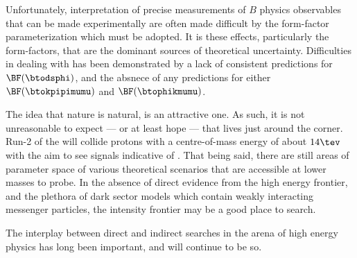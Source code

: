 Unfortunately, interpretation of precise measurements of $B$ physics observables that can be made
experimentally are often made difficult by the form-factor parameterization which must be adopted.
It is these \QCD effects, particularly the form-factors, that are the dominant sources of
theoretical uncertainty.
Difficulties in dealing with \QCD has been demonstrated by a lack of consistent predictions for
$\BF(\btodsphi)$, and the absnece of any predictions for either $\BF(\btokpipimumu)$ and
$\BF(\btophikmumu)$.

The idea that nature is natural, is an attractive one.
As such, it is not unreasonable to expect --- or at least hope --- that \np lives just
around the corner.
Run-2 of the \lhc will collide protons with a centre-of-mass energy of about $14\tev$ with the aim
to see signals indicative of \np.
That being said, there are still areas of parameter space of various theoretical scenarios that are
accessible at lower masses to probe.
In the absence of direct evidence from the high energy frontier, and
the plethora of dark sector models which contain weakly interacting messenger particles, the
intensity frontier may be a good place to search.

The interplay between direct and indirect searches in the arena of high energy physics
has long been important, and will continue to be so.





